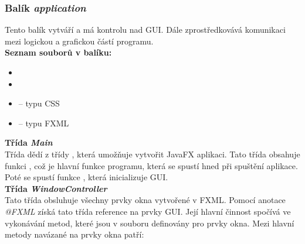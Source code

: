 \documentclass[
  biblatex=false,
  font=serif,
  glossaries=false,
  tables=false,
  theorems=false,
  index
]{kidiplom}
\begin{document}
\subsubsection{Balík \textit{application}}
\indent\indent Tento balík vytváří a má kontrolu nad GUI. Dále zprostředkovává komunikaci mezi logickou a grafickou částí programu. \\

\noindent \textbf{Seznam souborů v balíku:}
\begin{itemize}
\item {}
\item {}
\item {} -- typu CSS
\item {} -- typu FXML
\end{itemize}

\smallskip
\noindent \textbf{Třída \textit{Main}}\\
\indent Třída dědí z třídy , která umožňuje vytvořit JavaFX aplikaci. Tato třída obsahuje funkci , což je hlavní funkce programu, která se spustí hned při spuštění aplikace. Poté se spustí funkce , která inicializuje GUI.\\

\noindent \textbf{Třída \textit{WindowController}}\\
\indent Tato třída obsluhuje všechny prvky okna vytvořené v FXML. Pomocí anotace \textit{@FXML} získá tato třída reference na prvky GUI. Její hlavní činnost spočívá ve vykonávání metod, které jsou  v souboru  definovány pro prvky okna. Mezi hlavní metody navázané na prvky okna patří: 
\end{document}
